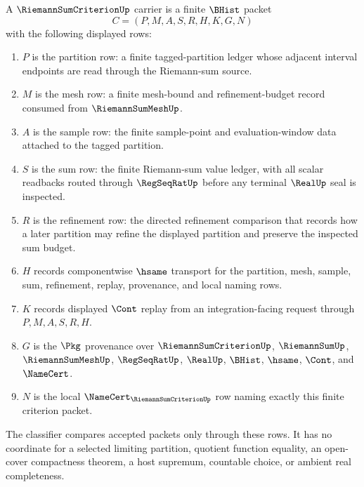\begin{definition}
\label{def:riemann-sum-criterion-carrier}
A $\RiemannSumCriterionUp$ carrier is a finite $\BHist$ packet
$$
C=(P,M,A,S,R,H,K,G,N)
$$
with the following displayed rows:
\begin{enumerate}
\item $P$ is the partition row: a finite tagged-partition ledger whose adjacent interval endpoints are read through the Riemann-sum source.
\item $M$ is the mesh row: a finite mesh-bound and refinement-budget record consumed from $\RiemannSumMeshUp$.
\item $A$ is the sample row: the finite sample-point and evaluation-window data attached to the tagged partition.
\item $S$ is the sum row: the finite Riemann-sum value ledger, with all scalar readbacks routed through $\RegSeqRatUp$ before any terminal $\RealUp$ seal is inspected.
\item $R$ is the refinement row: the directed refinement comparison that records how a later partition may refine the displayed partition and preserve the inspected sum budget.
\item $H$ records componentwise $\hsame$ transport for the partition, mesh, sample, sum, refinement, replay, provenance, and local naming rows.
\item $K$ records displayed $\Cont$ replay from an integration-facing request through $P,M,A,S,R,H$.
\item $G$ is the $\Pkg$ provenance over $\RiemannSumCriterionUp$, $\RiemannSumUp$, $\RiemannSumMeshUp$, $\RegSeqRatUp$, $\RealUp$, $\BHist$, $\hsame$, $\Cont$, and $\NameCert$.
\item $N$ is the local $\NameCert_{\RiemannSumCriterionUp}$ row naming exactly this finite criterion packet.
\end{enumerate}
The classifier compares accepted packets only through these rows. It has no coordinate for a selected limiting partition, quotient function equality, an open-cover compactness theorem, a host supremum, countable choice, or ambient real completeness.
\end{definition}

